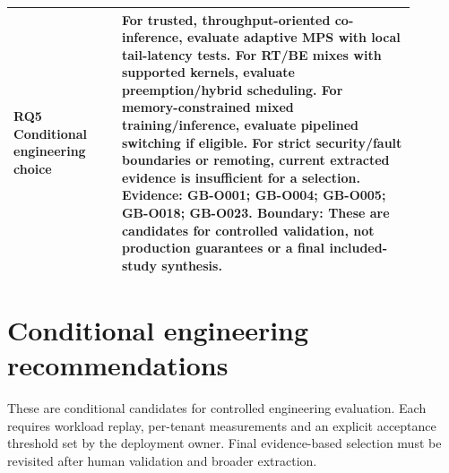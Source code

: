 \documentclass[12pt,a4paper]{article}
\begin{document}
\begin{longtable}{p{0.24\linewidth}p{0.65\linewidth}}
RQ5 Conditional engineering choice & For trusted, throughput-oriented co-inference, evaluate adaptive MPS with local tail-latency tests. For RT/\allowbreak{}BE mixes with supported kernels, evaluate preemption/\allowbreak{}hybrid scheduling. For memory-constrained mixed training/\allowbreak{}inference, evaluate pipelined switching if eligible. For strict security/\allowbreak{}fault boundaries or remoting, current extracted evidence is insufficient for a selection. Evidence: GB-O001; GB-O004; GB-O005; GB-O018; GB-O023. Boundary: These are candidates for controlled validation, not production guarantees or a final included-study synthesis.\\
\bottomrule
\end{longtable}

\section{Conditional engineering recommendations}
These are conditional candidates for controlled engineering evaluation. Each requires workload replay, per-tenant measurements and an explicit acceptance threshold set by the deployment owner. Final evidence-based selection must be revisited after human validation and broader extraction.
\end{document}

